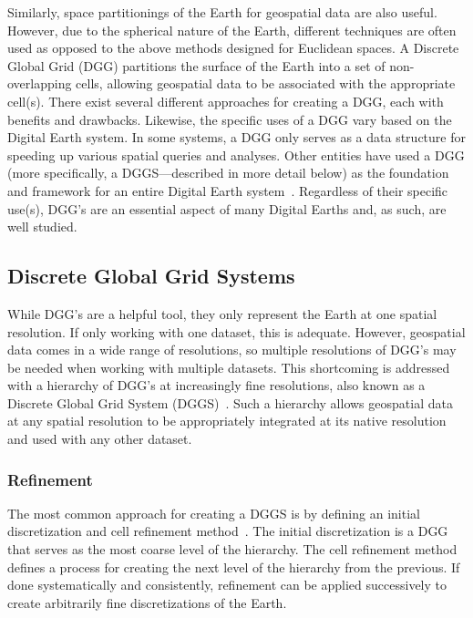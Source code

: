 Similarly, space partitionings of the Earth for geospatial data are also useful.
However, due to the spherical nature of the Earth, different techniques are often used as opposed to the above methods designed for Euclidean spaces.
A Discrete Global Grid (DGG) partitions the surface of the Earth into a set of non-overlapping cells, allowing geospatial data to be associated with the appropriate cell(s).
There exist several different approaches for creating a DGG, each with benefits and drawbacks.
Likewise, the specific uses of a DGG vary based on the Digital Earth system.
In some systems, a DGG only serves as a data structure for speeding up various spatial queries and analyses.
Other entities have used a DGG (more specifically, a DGGS---described in more detail below) as the foundation and framework for an entire Digital Earth system~\cite{peterson2011close}.
Regardless of their specific use(s), DGG's are an essential aspect of many Digital Earths and, as such, are well studied.


\subsection{Discrete Global Grid Systems} \label{chap:2:DGGS}
While DGG's are a helpful tool, they only represent the Earth at one spatial resolution.
If only working with one dataset, this is adequate.
However, geospatial data comes in a wide range of resolutions, so multiple resolutions of DGG's may be needed when working with multiple datasets.
This shortcoming is addressed with a hierarchy of DGG's at increasingly fine resolutions, also known as a Discrete Global Grid System (DGGS)~\cite{sahr1998discrete, sahr2003geodesic}.
Such a hierarchy allows geospatial data at any spatial resolution to be appropriately integrated at its native resolution and used with any other dataset.


\subsubsection{Refinement} \label{chap:2:refinement}
The most common approach for creating a DGGS is by defining an initial discretization and cell refinement method~\cite{mahdavi2015survey}.
The initial discretization is a DGG that serves as the most coarse level of the hierarchy. The cell refinement method defines a process for creating the next level of the hierarchy from the previous.
If done systematically and consistently, refinement can be applied successively to create arbitrarily fine discretizations of the Earth.


